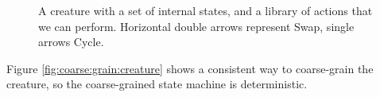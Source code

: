 \documentclass[]{article}
\begin{document}
\begin{figure}[H]
	\begin{center}
		\caption[A creature with a set of internal states]{A creature with a set of internal states, and a library of actions that we can perform. Horizontal double arrows represent Swap, single arrows Cycle.}\label{fig:copy:swap}
	\end{center}
\end{figure}

Figure \ref{fig:coarse:grain:creature} shows a consistent way to coarse-grain the creature, so the coarse-grained state machine is deterministic.
\end{document}
